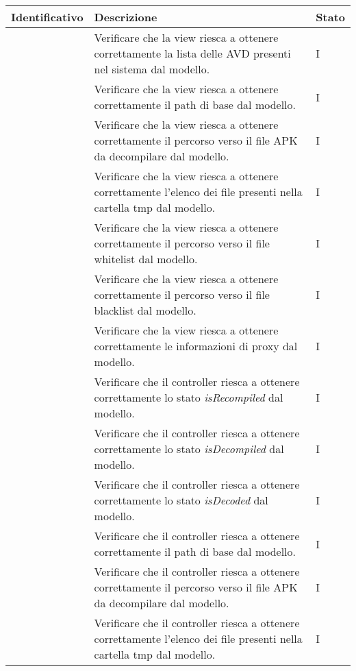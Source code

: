 \begin{longtable}{ |C{3cm} | C{8.5cm}| C{1.5cm} |}
    \hline
    \textbf{Identificativo} &
    \textbf{Descrizione} &
    \textbf{Stato} \\\hline
     & Verificare che la view riesca a ottenere correttamente la lista delle AVD presenti nel sistema dal modello.                & I \\\hline
     & Verificare che la view riesca a ottenere correttamente il path di base dal modello.                                        & I \\\hline
     & Verificare che la view riesca a ottenere correttamente il percorso verso il file APK da decompilare dal modello.           & I \\\hline
     & Verificare che la view riesca a ottenere correttamente l'elenco dei file presenti nella cartella tmp dal modello.          & I \\\hline
     & Verificare che la view riesca a ottenere correttamente il percorso verso il file whitelist dal modello.                    & I \\\hline
     & Verificare che la view riesca a ottenere correttamente il percorso verso il file blacklist dal modello.                    & I \\\hline
     & Verificare che la view riesca a ottenere correttamente le informazioni di proxy dal modello.                               & I \\\hline
     & Verificare che il controller riesca a ottenere correttamente lo stato \textit{isRecompiled} dal modello.                   & I \\\hline
     & Verificare che il controller riesca a ottenere correttamente lo stato \textit{isDecompiled} dal modello.                   & I \\\hline
     & Verificare che il controller riesca a ottenere correttamente lo stato \textit{isDecoded} dal modello.                      & I \\\hline
     & Verificare che il controller riesca a ottenere correttamente il path di base dal modello.                                  & I \\\hline
     & Verificare che il controller riesca a ottenere correttamente il percorso verso il file APK da decompilare dal modello.     & I \\\hline
     & Verificare che il controller riesca a ottenere correttamente l'elenco dei file presenti nella cartella tmp dal modello.    & I \\\hline

\end{longtable}

